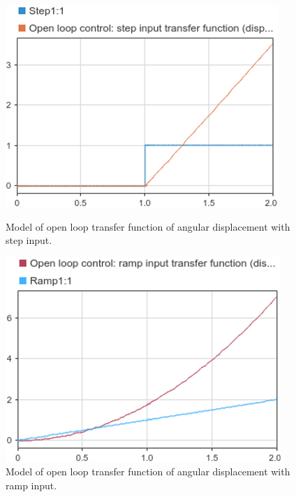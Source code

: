 \documentclass[conference]{IEEEtran}
\begin{document}
\begin{figure}[htbp]
    \centering
    \begin{minipage}[b]{0.24\textwidth}
      \includegraphics[width=\textwidth]{../img/q1-9.png}
      \caption{Model of open loop transfer function of angular displacement with step input.}
    \end{minipage}
    \hfill
    \begin{minipage}[b]{0.24\textwidth}
      \includegraphics[width=\textwidth]{../img/q1-10.png}
      \caption{Model of open loop transfer function of angular displacement with ramp input.}
    \end{minipage}
\end{figure}
\end{document}
